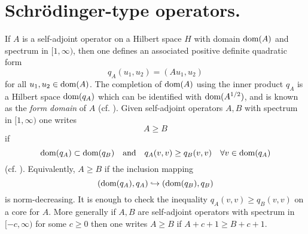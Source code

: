 \documentclass[11pt,reqno]{amsart}
\theoremstyle{definition}
\theoremstyle{remark}
\def\dom{\ensuremath{\textnormal{dom}}}
\begin{document}
\section{Schr\"odinger-type operators.}\label{sec:SchrodingerOps}
If $A$ is a self-adjoint operator on a Hilbert space $H$ with domain $\dom(A)$ and spectrum in $[1,\infty)$, then one defines an associated positive definite quadratic form
\[ q_A(u_1,u_2)=(Au_1,u_2)\]
for all $u_1,u_2 \in \dom(A)$.  The completion of $\dom(A)$ using the inner product $q_A$ is a Hilbert space $\dom(q_A)$ which can be identified with $\dom(A^{1/2})$, and is known as the \emph{form domain} of $A$ (cf. \cite[VIII.6]{ReedSimonI}).  Given self-adjoint operators $A,B$ with spectrum in $[1,\infty)$ one writes
\[ A \ge B\]
if
\[ \dom(q_A) \subset \dom(q_B) \quad \text{and} \quad q_A(v,v)\ge q_B(v,v) \quad \forall v \in \dom(q_A)\]
(cf. \cite[XIII.2, p.85]{ReedSimonIV}).  Equivalently, $A \ge B$ if the inclusion mapping
\[ (\dom(q_A),q_A) \hookrightarrow (\dom(q_B),q_B)\]
is norm-decreasing.  It is enough to check the inequality $q_A(v,v)\ge q_B(v,v)$ on a core for $A$.  More generally if $A,B$ are self-adjoint operators with spectrum in $[-c,\infty)$ for some $c \ge 0$ then one writes $A \ge B$ if $A+c+1 \ge B+c+1$.
\end{document}
